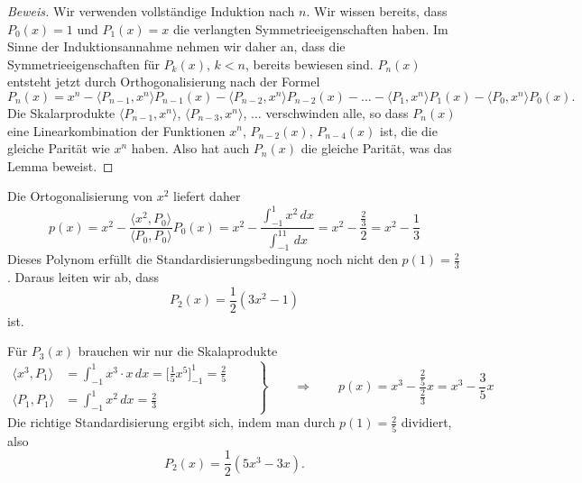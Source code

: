 \begin{proof}[Beweis]
Wir verwenden vollständige Induktion nach $n$.
Wir wissen bereits, dass $P_0(x)=1$ und $P_1(x)=x$ die verlangten
Symmetrieeigenschaften haben.
Im Sinne der Induktionsannahme nehmen wir daher an, dass die
Symmetrieeigenschaften für $P_k(x)$, $k<n$, bereits bewiesen sind.
$P_n(x)$ entsteht jetzt durch Orthogonalisierung nach der Formel
\[
P_n(x)
=
x^n
-
\langle P_{n-1},x^n\rangle P_{n-1}(x)
-
\langle P_{n-2},x^n\rangle P_{n-2}(x)
-\dots-
\langle P_1,x^n\rangle P_1(x)
-
\langle P_0,x^n\rangle P_0(x).
\]
Die Skalarprodukte
$\langle P_{n-1},x^n\rangle$,
$\langle P_{n-3},x^n\rangle$, $\dots$ verschwinden alle, so dass
$P_n(x)$ eine Linearkombination der Funktionen $x^n$, $P_{n-2}(x)$,
$P_{n-4}(x)$ ist, die die gleiche Parität wie $x^n$ haben.
Also hat auch $P_n(x)$ die gleiche Parität, was das Lemma beweist.
\end{proof}

Die Ortogonalisierung von $x^2$ liefert daher
\[
p(x) = x^2
-
\frac{\langle x^2,P_0\rangle}{\langle P_0,P_0\rangle} P_0(x)
=
x^2 - \frac{\int_{-1}^1x^2\,dx}{\int_{-1}^11\,dx}
=
x^2 - \frac{\frac{2}{3}}{2}=x^2-\frac13
\]
Dieses Polynom erfüllt die Standardisierungsbedingung noch 
nicht den $p(1)=\frac23$.
Daraus leiten wir ab, dass
\[
P_2(x) = \frac12(3x^2-1)
\]
ist.

Für $P_3(x)$ brauchen wir nur die Skalaprodukte
\[
\left.
\begin{aligned}
\langle x^3,P_1\rangle
&=
\int_{-1}^1  x^3\cdot x\,dx
=
\biggl[\frac15x^5\biggr]_{-1}^1
=
\frac25
\qquad
\\
\langle P_1,P_1\rangle
&=
\int_{-1}^1 x^2\,dx
=
\frac23
\end{aligned}
\right\}
\qquad
\Rightarrow
\qquad
p(x) = x^3 - \frac{\frac25}{\frac23}x=x^3-\frac{3}{5}x
\]
Die richtige Standardisierung ergibt sich,
indem man durch $p(1)=\frac25$ dividiert, also
\[
P_2(x) = \frac12(5x^3-3x).
\]

